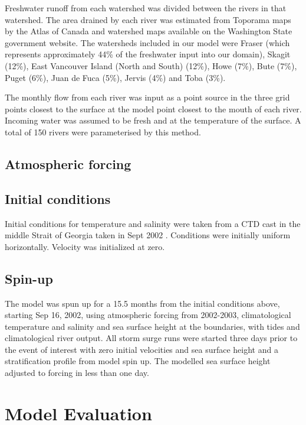 \documentclass[pdftex,12pt]{article}
\begin{document}
Freshwater runoff from each watershed was divided between the rivers in that watershed. The area drained by each river was estimated from Toporama maps by the Atlas of Canada and watershed maps available on the Washington State government website. The watersheds included in our model were Fraser (which represents approximately 44\% of the freshwater input into our domain), Skagit (12\%), East Vancouver Island (North and South) (12\%), Howe (7\%), Bute (7\%), Puget (6\%), Juan de Fuca (5\%), Jervis (4\%) and Toba (3\%). 

The monthly flow from each river was input as a point source in the three grid points closest to the surface at the model point closest to the mouth of each river. Incoming water was assumed to be fresh and at the temperature of the surface. A total of 150 rivers were parameterised by this method. 


\subsection{Atmospheric forcing}

\subsection{Initial conditions}
Initial conditions for temperature and salinity were taken from a CTD cast in the middle Strait of Georgia taken in Sept 2002 \citep{pawlowiczetal2007}.  Conditions were initially uniform horizontally.  Velocity was initialized at zero.

\subsection{Spin-up}
The model was spun up for a 15.5 months from the initial conditions above, starting Sep 16, 2002, using atmospheric forcing from 2002-2003, climatological temperature and salinity and sea surface height at the boundaries, with tides and climatological river output.  All storm surge runs were started three days prior to the event of interest with zero initial velocities and sea surface height and a stratification profile from model spin up. The modelled sea surface height adjusted to forcing in less than one day. 

\section{Model Evaluation}\label{sec:model}
\end{document}
